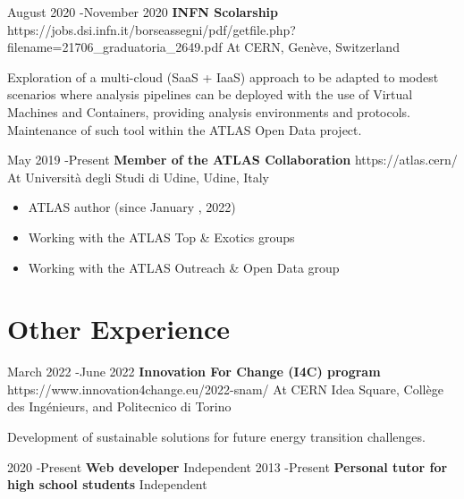 \documentclass[10pt]{article} %
\begin{document}
\job
{August 2020 -}{November 2020}
{\textbf{INFN Scolarship}}
{https://jobs.dsi.infn.it/borseassegni/pdf/getfile.php?filename=21706_graduatoria_2649.pdf}
{At CERN, Genève, Switzerland}
{\begin{minipage}[c][][b]{0,7\textwidth}
 Exploration of a multi-cloud (SaaS + IaaS) approach to be adapted to modest scenarios where analysis pipelines can be deployed with the use of Virtual Machines and Containers, providing analysis environments and protocols. Maintenance of such tool within the ATLAS Open Data project. 
\end{minipage}
}


\job
{May 2019 -}{Present}
{\textbf{Member of the ATLAS Collaboration}}
{https://atlas.cern/}
{At Università degli Studi di Udine, Udine, Italy}
{
\begin{itemize}
    \item ATLAS author (since January , 2022)
    \item Working with the ATLAS Top \& Exotics groups
    \item Working with the ATLAS Outreach \& Open Data group
\end{itemize}
}

\section{Other Experience}


\job
{March 2022 -}{June 2022}
{\textbf{Innovation For Change (I4C) program}}
{https://www.innovation4change.eu/2022-snam/}
{At CERN Idea Square, Collège des Ingénieurs, and Politecnico di Torino}
{\begin{minipage}[c][][b]{0,7\textwidth}
Development of sustainable solutions for future energy transition challenges.
\end{minipage}
}

\job
{2020 -}{Present}
{\textbf{Web developer}}
{}
{Independent}
{}
\vspace{-10mm}
\job
{2013 -}{Present}
{\textbf{Personal tutor for high school students}}
{}
{Independent}
\end{document}
